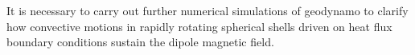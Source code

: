 {\color{red}
It is necessary to carry out further numerical simulations of geodynamo to clarify how convective motions in rapidly rotating spherical shells driven on heat flux boundary conditions sustain the dipole magnetic field.
}
{\color{blue}
}

{\color{red}
{\color{blue}
}
} 
%
%
%
%
